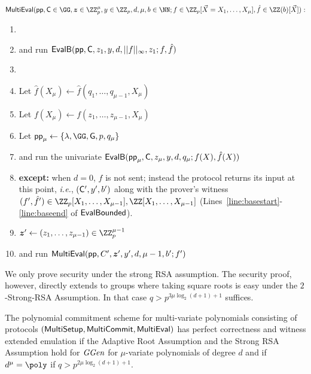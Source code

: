  \begin{mdframed}
\begin{minipage}{\textwidth}
			$\pro{MultiEval}(\params, \gr{C}\in \GG, \boldsymbol{z}\in \ZZ^\mu_p,y \in \ZZ_p, d,\mu,b \in \NN; f \in \ZZ_p[\vec{X}= X_1,\ldots,X_\mu], \hat{f}\in \ZZ(b)[\vec{X}]) :$
			\begin{enumerate}[nolistsep]
			\item {} 
			\item \pcind[1] \prover and \verifier run $\pro{EvalB}(\params,\gr{C},z_1,y,d,||f||_\infty,z_1;f,\hat{f})$ 
			\item \pcelse
			\item \pcind[1] Let $\hat{f}(X_\mu)\gets \hat{f}(q_1,\dots,q_{\mu-1},X_\mu)$
			\item \pcind[1] Let $f(X_\mu)\gets f(z_1,\dots,z_{\mu-1},X_\mu)$

			\item \pcind[1] Let $\crs_\mu \gets \{\lambda,\GG,\gr{g},p,q_\mu\}$
			\item \pcind[1] \prover and \verifier run the univariate $\pro{EvalB}(\params_\mu,\gr{C},z_\mu,y,d,q_\mu;f(X),\hat{f}(X))$
			\item \pcind[2] \textbf{except:} when $d=0$, $f$ is not sent; instead the protocol returns its input at this point, \emph{i.e.}, $(\gr{C}',y',b')$ along with the prover's witness $(f',\hat{f}') \in \ZZ_p[X_1,\dots,X_{\mu-1}],\ZZ[X_1,\dots,X_{\mu-1}]$ (Lines~\ref{line:basestart}-\ref{line:baseend} of $\textsf{{EvalBounded}}$). 
			\item \pcind[1]$\boldsymbol{z}'\gets (z_1,\dots,z_{\mu-1})\in \ZZ_p^{\mu-1}$
			\item \pcind[1]\prover and \verifier run $\textsf{{MultiEval}}(\textsf{pp},C',\boldsymbol{z}',y',d,\mu-1,b';f')$
		    \end{enumerate}
      \end{minipage}
\end{mdframed}

We only prove security under the strong RSA assumption. The security proof, however, directly extends to groups where taking square roots is easy under the $2$-Strong-RSA Assumption. In that case $q>p^{3\mu \log_2(d+1)+1}$ suffices.
\begin{theorem}
\label{thm:mvariate}
	The polynomial commitment scheme for multi-variate polynomials consisting of protocols $(\textsf{{MultiSetup}},\textsf{{MultiCommit}},\textsf{{MultiEval}})$ has perfect correctness and witness extended emulation if the Adaptive Root Assumption and the Strong RSA Assumption hold for $\textit{GGen}$ for $\mu$-variate polynomials of degree $d$ and if $d^\mu=\poly$ if $q> p^{2 \mu \log_2(d+1)+1}$.
\end{theorem}


